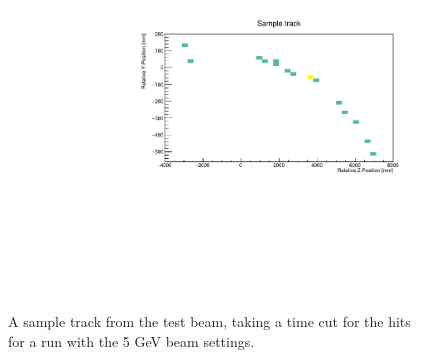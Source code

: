 \begin{figure}[h!]
\centering
\includegraphics[width=\textwidth]{figures/SampleTrack5GeVYZ.pdf}
\caption{A sample track from the test beam, taking a time cut for the hits for a run with the 5 GeV beam settings.}
\label{fig:event}
\end{figure}


